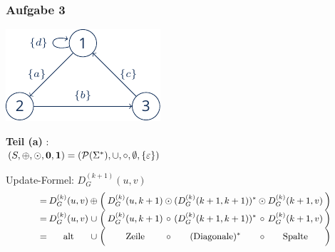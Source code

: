 \documentclass{beamer}
\begin{document}


\begin{frame} \frametitle{Aufgabe 3}
	\begin{minipage}{\dimexpr0.5\linewidth-\fboxrule-\fboxsep}
		\includegraphics[width=\linewidth]{./tut12_task3-graph.pdf}
	\end{minipage} 
	\pause
	\begin{minipage}{\dimexpr0.5\linewidth-\fboxrule-\fboxsep}
		\centering
		\textbf{Teil (a)} : \\
		$(S, \oplus, \odot, \mathbf{0}, \mathbf{1}) = (\mathcal{P}(\Sigma^\ast), \cup, \circ, \emptyset, \left\{ \varepsilon \right\})$
	\end{minipage}

	\hspace{1em} \pause
	
	Update-Formel: $D_G^{(k+1)}(u,v)$
	\begin{equation*}
	\small
	\setlength{\arraycolsep}{1pt}
		\begin{array}{rccrcccccr}
			=& D_G^{(k)}(u,v) &\oplus& \Big( & D_G^{(k)}(u,k+1) &\odot& (D_G^{(k)}(k+1,k+1))^\ast &\odot& D_G^{(k)}(k+1,v) & \Big) \\
			=& D_G^{(k)}(u,v) &\cup& \Big( & D_G^{(k)}(u,k+1) &\circ& (D_G^{(k)}(k+1,k+1))^\ast &\circ& D_G^{(k)}(k+1,v) & \Big) \\
			=& \text{alt} &\cup& \Big(& \text{Zeile} &\circ& (\text{Diagonale})^\ast &\circ& \text{Spalte} & \Big)
		\end{array}
	\end{equation*}
\end{frame}
\end{document}
